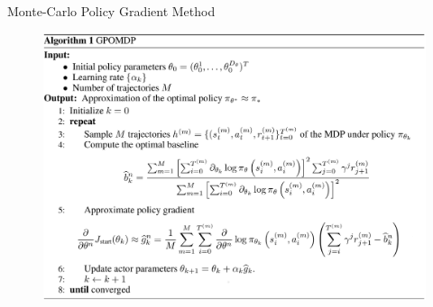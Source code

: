 \begin{frame}{Monte-Carlo Policy Gradient Method}
	\begin{figure}[h]
		\centering
		\includegraphics[width=1.0\framewidth]{Images/gpomdp}
	\end{figure}
\end{frame}
